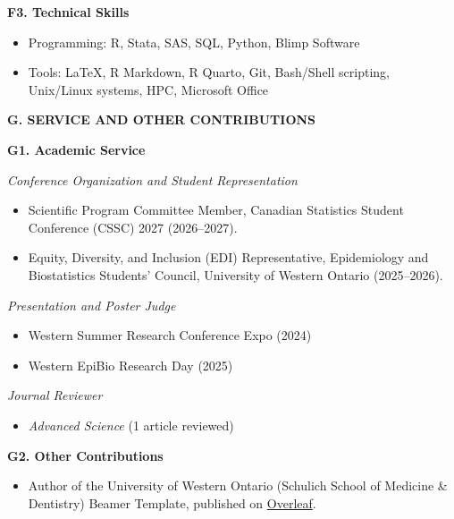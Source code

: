 \documentclass[10pt]{article}
\newcommand{\cvsection}[1]{%
  \Needspace{5\baselineskip}%
  \vspace{0.65em}%
  {\large\bfseries\color{sectiongray} #1}\par
  \vspace{0.18em}%
}
\newcommand{\cvsubsection}[1]{%
  \Needspace{4\baselineskip}%
  \vspace{0.3em}%
  {\bfseries #1}\par
}
\newcommand{\cvitalic}[1]{%
  {\itshape #1}\par
}
\begin{document}
\cvsubsection{F3. Technical Skills}
\begin{itemize}[leftmargin=1.6em,label=--]
\item Programming: R, Stata, SAS, SQL, Python, Blimp Software
\item Tools: LaTeX, R Markdown, R Quarto, Git, Bash/Shell scripting, Unix/Linux systems, HPC, Microsoft Office
\end{itemize}

\cvsection{G. SERVICE AND OTHER CONTRIBUTIONS}

\cvsubsection{G1. Academic Service}
\cvitalic{Conference Organization and Student Representation}
\begin{itemize}[leftmargin=1.6em,label=--]
\item Scientific Program Committee Member, Canadian Statistics Student Conference (CSSC) 2027 (2026--2027).
\item Equity, Diversity, and Inclusion (EDI) Representative, Epidemiology and Biostatistics Students' Council, University of Western Ontario (2025--2026).
\end{itemize}

\cvitalic{Presentation and Poster Judge}
\begin{itemize}[leftmargin=1.6em,label=--]
\item Western Summer Research Conference Expo (2024)
\item Western EpiBio Research Day (2025)
\end{itemize}

\cvitalic{Journal Reviewer}
\begin{itemize}[leftmargin=1.6em,label=--]
\item \emph{Advanced Science} (1 article reviewed)
\end{itemize}

\cvsubsection{G2. Other Contributions}
\begin{itemize}[leftmargin=1.6em,label=--]
\item Author of the University of Western Ontario (Schulich School of Medicine \& Dentistry) Beamer Template, published on \href{https://www.overleaf.com/latex/templates/university-of-western-ontario-schulich-school-of-medicine-and-dentistry-beamer-template/rrypngybtxsd}{Overleaf}.
\end{itemize}
\end{document}
